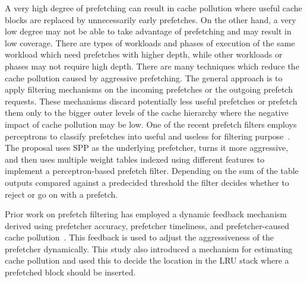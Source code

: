 A very high degree of prefetching can result in cache pollution where useful cache blocks are replaced by unnecessarily early prefetches. On the other hand, a very low degree may not be able to take advantage of prefetching and may result in low coverage. There are types of workloads and phases of execution of the same workload which need prefetches with higher depth, while other workloads or phases may not require high depth. There are many techniques which reduce the cache pollution caused by aggressive prefetching. The general approach is to apply filtering mechanisms on the incoming prefetches or the outgoing prefetch requests. These mechanisms discard potentially less useful prefetches or prefetch them only to the bigger outer levels of the cache hierarchy where the negative impact of cache pollution may be low. One of the recent prefetch filters employs perceptrons to classify prefetches into useful and useless for filtering purpose~\cite{Perceptron filtering}. The proposal uses SPP as the underlying prefetcher, turns it more aggressive, and then uses multiple weight tables indexed using different features to implement a perceptron-based prefetch filter. Depending on the sum of the table outputs compared against a predecided threshold the filter decides whether to reject or go on with a prefetch.

Prior work on prefetch filtering has employed a dynamic feedback mechanism derived using prefetcher accuracy, prefetcher timeliness, and prefetcher-caused cache pollution~\cite{Feedback Directed Prefetching}. This feedback is used to adjust the aggressiveness of the prefetcher dynamically. This study also introduced a mechanism for estimating cache pollution and used this to decide the location in the LRU stack where a prefetched block should be inserted.  

